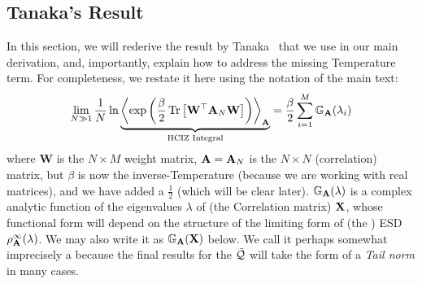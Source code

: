 \subsection{Tanaka's Result}
\label{sxn:tanaka}

In this section, we will rederive the result by Tanaka~\cite{Tanaka2007,Tanaka2008} that we use in our main derivation,
and, importantly, explain how to address the missing Temperature term.
For completeness, we restate it here using the notation of the main text:
\begin{equation}
  \label{eqn:hciz}
  \lim_{N \gg 1} \frac{1}{N} \ln 
\underbrace{
  \Expected[\mathbf{\AMAT}]{
    \exp\left(\frac{\beta}{2}
    \Trace{\mathbf{W}^{\top} \AMAT_N \mathbf{W}}
    \right)
  }
 }_{\text{HCIZ Integral}}
  = \frac{\beta}{2} \sum_{i=1}^{M} \GNORM(\lambda_{i})
\end{equation}
where 
$\mathbf{W}$ is the $N\times M$ \Teacher weight matrix, 
$\mathbf{A}=\mathbf{A}_N$ is the $N\times N$ \Student (correlation) matrix, 
but $\beta$ is now the inverse-Temperature (because we are working with real matrices),
and we have added a $\tfrac{1}{2}$ (which will be clear later).
$\mathbb{G}_{\mathbf{A}}(\lambda)$ is a complex analytic function of the eigenvalues $\lambda$ of (the \Teacher Correlation matrix) $\mathbf{X}$, 
whose functional form will depend on the structure of the limiting form of (the \Student) ESD $\rho_{\mathbf{A}}^{\infty}(\lambda)$.
We may also write it as $\mathbb{G}_{\mathbf{A}}(\mathbf{X})$ below.
We call it perhaps somewhat imprecisely a  \emph{\GEN} because the final results for the \LayerQuality  $\bar{\mathcal{Q}}$ will take the form of a \emph{Tail norm} in many cases.


